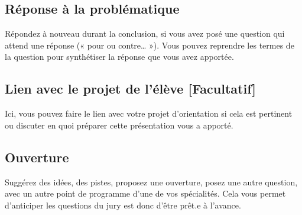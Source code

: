 \subsection*{Réponse à la problématique}
Répondez à nouveau durant la conclusion, si vous avez posé une question qui attend une réponse (« pour ou contre… »).
Vous pouvez reprendre les termes de la question pour synthétiser la réponse que vous avez apportée.

\subsection*{Lien avec le projet de l'élève [Facultatif]}
Ici, vous pouvez faire le lien avec votre projet d'orientation si cela est pertinent ou discuter en quoi préparer cette présentation vous a apporté.

\subsection*{Ouverture}
Suggérez des idées, des pistes, proposez une ouverture, posez une autre question, avec un autre point de programme d’une de vos spécialités.
Cela vous permet d'anticiper les questions du jury est donc d'être prêt.e à l'avance.

